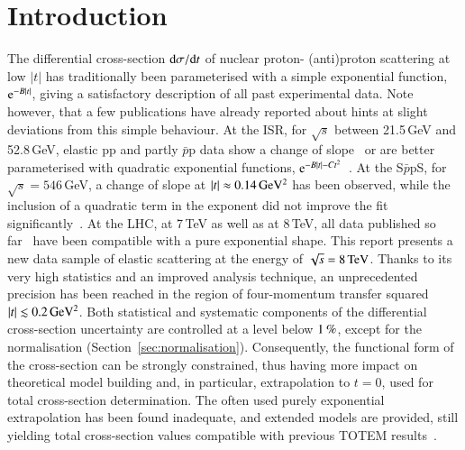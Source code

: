 \section{Introduction}
%
The differential cross-section ${\rm d} \sigma/{\rm d} t$ of nuclear proton- \linebreak
(anti)proton 
scattering at low $|t|$ has traditionally been parameterised with a simple 
exponential function, ${\rm e}^{-B |t|}$, giving a satisfactory description of 
all past experimental data.
Note however, that a few publications have already reported about hints at 
slight deviations from this simple behaviour. At the ISR, for $\sqrt{s}$ 
between 21.5\,GeV and 52.8\,GeV, elastic pp and partly $\bar{p}$p data show a 
change of slope~\cite{plb39,plb115} or are better parameterised with quadratic 
exponential functions, ${\rm e}^{-B |t|-C t^2}$~\cite{npb141,npb248}. 
At the S$\bar{p}$pS, for 
$\sqrt{s} = 546\,$GeV, a change of slope at $|t| \approx 0.14\,\rm GeV^{2}$ 
has been observed, while the inclusion of a quadratic term in the exponent did
not improve the fit significantly~\cite{plb147}.
At the LHC, at 7\,TeV as well as at 8\,TeV, all data published so 
far~\cite{epl96,epl101-el,prl111,alfa} have been
compatible with a pure exponential shape.
This report presents a new data sample of elastic scattering at the energy of $\sqrt s = 8\,{\rm TeV}$. Thanks to its very high statistics and an improved analysis technique, an unprecedented precision has been reached in the region of four-momentum transfer squared $|t| \lesssim 0.2\,{\rm GeV^2}$. Both statistical and systematic components of the differential cross-section uncertainty are controlled 
at a level below $1\,{\rm \%}$, except for the normalisation 
(Section~\ref{sec:normalisation}). Consequently, the functional form of the cross-section can be strongly constrained, thus having more impact on theoretical model building and, in particular, extrapolation to $t=0$, used for total cross-section determination. The often used purely exponential extrapolation has been found inadequate, and extended models are provided, still yielding total cross-section values compatible with previous TOTEM results~\cite{prl111}.



